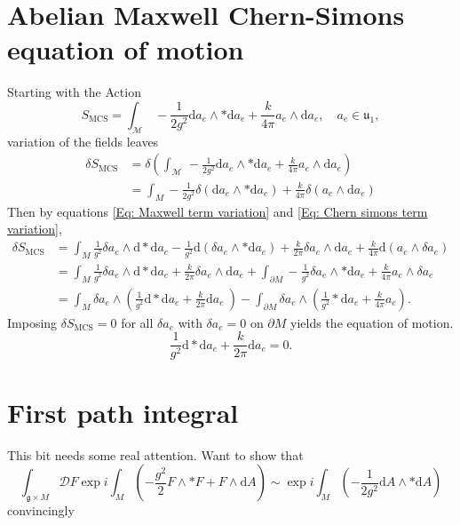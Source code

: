 \documentclass{article}
\begin{document}
\section{Abelian Maxwell Chern-Simons equation of motion}
\label{appendixamcseom}
Starting with the Action
\begin{equation}
    S_{\text{MCS}} = \int_{\mathcal{M}} \, -\frac{1}{2g^{2}} \mathrm{d}a_{e}\wedge * \mathrm{d}a_{e} + \frac{k}{4\pi}a_{e}\wedge \mathrm{d}a_{e},\quad a_{e}\in \mathfrak{u_{1}},
\end{equation}
variation of the fields leaves
\begin{align}
    \delta S_{\text{MCS}} &= \delta \left(\int_{\mathcal{M}} \, -\frac{1}{2g^{2}} \mathrm{d}a_{e}\wedge * \mathrm{d}a_{e} + \frac{k}{4\pi}a_{e}\wedge \mathrm{d}a_{e} \right)\nonumber \\
    &= \int_{M}-\frac{1}{2g^{2}}\delta\left(\mathrm{d}a_{e}\wedge * \mathrm{d}a_{e}\right)+\frac{k}{4\pi}\delta\left(a_{e}\wedge \mathrm{d}a_{e}\right)\nonumber
\end{align}
Then by equations \eqref{Eq: Maxwell term variation} and \eqref{Eq: Chern simons term variation}, 
\begin{align}
    \delta S_{\text{MCS}} &=\int_{M} \frac{1}{g^{2}}\delta a_{e}\wedge\mathrm{d}* \mathrm{d}a_{e} - \frac{1}{g^{2}}\mathrm{d}\left(\delta a_{e}\wedge * \mathrm{d}a_{e}\right) + \frac{k}{2\pi}\delta a_{e}\wedge \mathrm{d}a_{e} + \frac{k}{4\pi}\mathrm{d}\left(a_{e}\wedge \delta a_{e} \right)\nonumber\\
    &= \int_{M} \frac{1}{g^{2}}\delta a_{e}\wedge \mathrm{d}* \mathrm{d}a_{e} + \frac{k}{2\pi}\delta a_{e}\wedge \mathrm{d}a_{e} + \int_{\partial M}-\frac{1}{g^{2}}\delta a_{e}\wedge *\mathrm{d}a_{e} + \frac{k}{4\pi}a_{e}\wedge \delta a_{e}\nonumber\\
    &= \int_{M}\delta a_{e}\wedge \left(\frac{1}{g^{2}}\mathrm{d}* \mathrm{d}a_{e} + \frac{k}{2\pi}\mathrm{d}a_{e}\ \right)-\int_{\partial M}\delta a_{e}\wedge \left(\frac{1}{g^{2}}*\mathrm{d}a_{e} + \frac{k}{4\pi}a_{e}\right)\nonumber.
\end{align}
Imposing $\delta S_{\text{MCS}} = 0$ for all $\delta a_{e}$ with $\delta a_{e}=0$ on $\partial M$ yields the equation of motion.
\begin{equation}
    \frac{1}{g^{2}}\mathrm{d}*\mathrm{d}a_{e} + \frac{k}{2\pi}\mathrm{d}a_{e}=0.
\end{equation}


\section{First path integral}
\label{appendixfirstpathintegral}
\color{red}This bit needs some real attention. Want to show that 
\begin{equation}
    \boxed{
    \int_{\mathfrak{g}\times M}\mathcal{D}F\exp i \int_{M}\left(-\frac{g^{2}}{2}F\wedge * F + F\wedge \mathrm{d}A \right)\sim \exp i \int_{M}\left(-\frac{1}{2g^{2}}\mathrm{d}A\wedge *\mathrm{d}A\right)
    }
\end{equation}
convincingly
\color{black}
\end{document}
